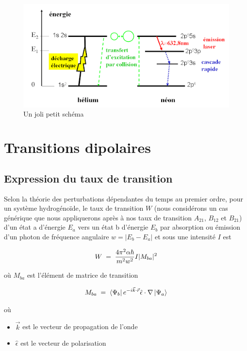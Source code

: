 \begin{figure}[tph]
    \centering
    \includegraphics[scale=0.8]{Images2/hélium-néon.png}
    \caption{Un joli petit schéma}
    \label{fig:schéma hélium-néon}
\end{figure}



\newpage
\section{Transitions dipolaires}
\subsection{Expression du taux de transition}



Selon la théorie des perturbations dépendantes du temps au premier ordre, pour un système hydrogénoïde, le taux de transition $W$ (nous considérons un cas générique que nous appliquerons après à nos taux de transition $A_{21}$, $B_{12}$ et $B_{21}$) d'un état a d'énergie $E_a$ vers un état b d'énergie $E_b$ par absorption ou émission d'un photon de fréquence angulaire $w=|E_b-E_a|$ et sous une intensité $I$ est  

\begin{equation}
    W\; = \; \dfrac{4\pi^2 \alpha \hbar}{m^2 w^2}I|M_{ba}|^2
\end{equation}

où $M_{ba}$ est l'élément de matrice de transition

\begin{equation}
    M_{ba}\; = \; \bra{\Psi_b}e^{-i\vec{k}\cdot \vec{r}}\hat{\epsilon}\cdot\nabla \ket{\Psi_a}
    \label{Mba}
\end{equation}

où \begin{itemize}[label=$\bullet$]
    \item $\vec{k}$ est le vecteur de propagation de l'onde
    \item $\hat{\epsilon}$ est le vecteur de polarisation
\end{itemize}


